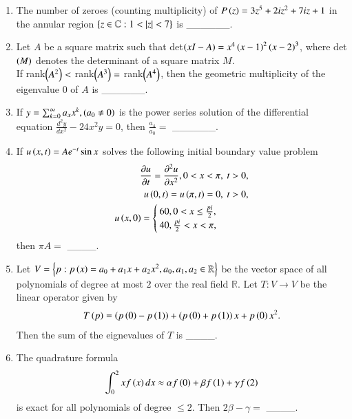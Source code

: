 \documentclass[journal]{IEEEtran}
\begin{document}
\begin{enumerate}
    \item The number of zeroes (counting multiplicity) of $P\left(z\right) = 3z^5 + 2iz^2 + 7iz + 1$ in the annular region $\left\{z \in \mathbb{C} : 1<\left\vert z\right\vert<7\right\}$ is \_\_\_\_\_\_.

    \item Let $A$ be a square matrix such that det$\left(xI - A\right) = x^4\left(x-1\right)^2 \left(x-2\right)^3$, where det$\left(M\right)$ denotes the determinant of a square matrix $M$. \\ If rank$\left(A^2\right) <$ rank$\left(A^3\right)=$ rank$\left(A^4\right)$, then the geometric multiplicity of the eigenvalue $0$ of $A$ is \_\_\_\_\_\_.

    \item If $y = \sum_{k=0}^{\infty} a_x x^k, \left(a_0 \neq 0\right)$ is the power series solution of the differential equation $\frac{d^2y}{dx^2} - 24x^2y = 0$, then $\frac{a_4}{a_0} =$ \_\_\_\_\_\_.

    \item If $u\left(x,t\right) = A e^{-t} \sin x$ solves the following initial boundary value problem
        \begin{align*}
            \frac{\partial u}{\partial t} = \frac{\partial ^2 u}{\partial x^2}, 0<x<\pi, \text{   } &t>0,\\
            u\left(0,t\right) = u\left(\pi,t\right) = 0, \text{   } &t>0,\\
            u\left(x,0\right) = 
                \begin{cases}
                    60, 0<x \leq \frac{pi}{2}, \\
                    40, \frac{pi}{2} < x < \pi,
                \end{cases}
        \end{align*}
        then $\pi A =$ \_\_\_\_.
        
    \item Let $V = \left\{p : p\left(x\right) = a_0 + a_1 x + a_2 x^2, a_0, a_1, a_2 \in \mathbb{R}\right\}$ be the vector space of all polynomials of degree at most $2$ over the real field $\mathbb{R}$. Let $T:V \rightarrow V$ be the linear operator given by
        \begin{align*}
            T\left(p\right) = \left(p\left(0\right) - p\left(1\right)\right) + \left(p\left(0\right) + p\left(1\right)\right)x + p\left(0\right)x^2.
        \end{align*}
        Then the sum of the eignevalues of $T$ is \_\_\_\_.

    \item The quadrature formula
        \begin{align*}
            \int_0^2 x f \left(x\right) dx \approx \alpha f \left(0\right) + \beta f \left(1\right) + \gamma f \left(2\right)
        \end{align*}
        is exact for all polynomials of degree $\leq 2$. Then $2\beta - \gamma =$ \_\_\_\_.


\end{enumerate}
\end{document}
